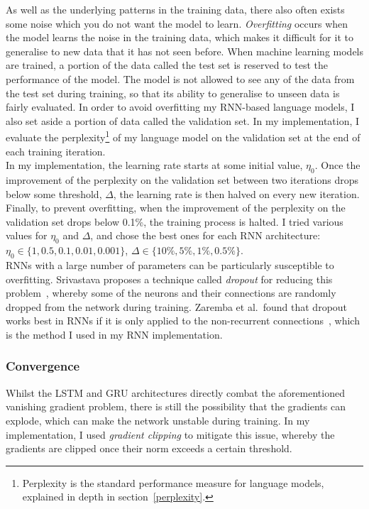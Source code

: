 \documentclass[a4paper, 12pt]{report}
\newcommand{\tit}[1]{\textit{#1}}
\begin{document}
As well as the underlying patterns in the training data, there also often exists some noise which you do not want the model to learn. \tit{Overfitting} occurs when the model learns the noise in the training data, which makes it difficult for it to generalise to new data that it has not seen before. When machine learning models are trained, a portion of the data called the test set is reserved to test the performance of the model. The model is not allowed to see any of the data from the test set during training, so that its ability to generalise to unseen data is fairly evaluated. In order to avoid overfitting my RNN-based language models, I also set aside a portion of data called the validation set. In my implementation, I evaluate the perplexity\footnote{Perplexity is the standard performance measure for language models, explained in depth in section~\ref{perplexity}.} of my language model on the validation set at the end of each training iteration. \\

In my implementation, the learning rate starts at some initial value, $\eta_0$. Once the improvement of the perplexity on the validation set between two iterations drops below some threshold, $\Delta$, the learning rate is then halved on every new iteration. Finally, to prevent overfitting, when the improvement of the perplexity on the validation set drops below 0.1\%, the training process is halted. I tried various values for $\eta_0$ and $\Delta$, and chose the best ones for each RNN architecture: $\eta_0 \in \{1, 0.5, 0.1, 0.01, 0.001\}$, $\Delta \in \{10\%, 5\%, 1\%, 0.5\%\}$. \\

RNNs with a large number of parameters can be particularly susceptible to overfitting. Srivastava proposes a technique called \tit{dropout} for reducing this problem~\cite{dropout:srivastava2013}, whereby some of the neurons and their connections are randomly dropped from the network during training. Zaremba et al.\ found that dropout works best in RNNs if it is only applied to the non-recurrent connections~\cite{dropout_rnns:zaremba2014}, which is the method I used in my RNN implementation.

\subsubsection{Convergence}
Whilst the LSTM and GRU architectures directly combat the aforementioned vanishing gradient problem, there is still the possibility that the gradients can explode, which can make the network unstable during training. In my implementation, I used \tit{gradient clipping} to mitigate this issue, whereby the gradients are clipped once their norm exceeds a certain threshold. \\
\end{document}

